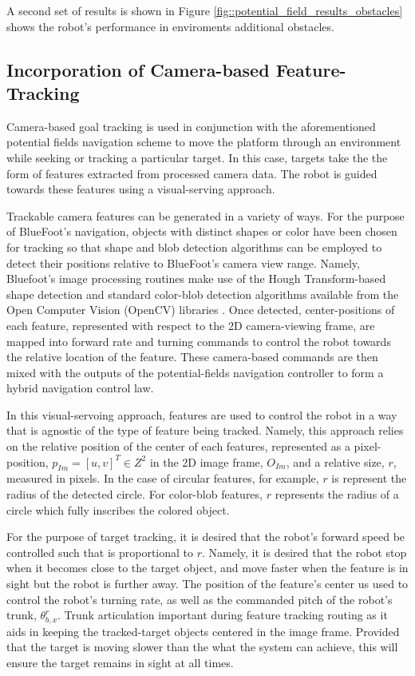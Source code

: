 			A second set of results is shown in Figure \ref{fig::potential_field_results_obstacles} shows the robot's performance in enviroments additional obstacles.

		\subsection{Incorporation of Camera-based Feature-Tracking}
		
			Camera-based goal tracking is used in conjunction with the aforementioned potential fields navigation scheme to move the platform through an environment while seeking or tracking a particular target. In this case, targets take the the form of features extracted from processed camera data. The robot is guided towards these features using a visual-serving approach. 

			Trackable camera features can be generated in a variety of ways. For the purpose of BlueFoot's navigation, objects with distinct shapes or color have been chosen for tracking so that shape and blob detection algorithms can be employed to detect their positions relative to BlueFoot's camera view range. Namely, Bluefoot's image processing routines make use of the Hough Transform-based shape detection and standard color-blob detection algorithms available from the Open Computer Vision (OpenCV) libraries \cite{opencv_library}. Once detected, center-positions of each feature, represented with respect to the 2D camera-viewing frame, are mapped into forward rate and turning commands to control the robot towards the relative location of the feature. These camera-based commands are then mixed with the outputs of the potential-fields navigation controller to form a hybrid navigation control law.

			In this visual-servoing approach, features are used to control the robot in a way that is agnostic of the type of feature being tracked. Namely, this approach relies on the relative position of the center of each features, represented as a pixel-position, $p_{Im} = [u,v]^{T} \in Z^{2}$ in the 2D image frame, $O_{Im}$, and a relative size, $r$, measured in pixels. In the case of circular features, for example, $r$ is represent the radius of the detected circle. For color-blob features, $r$ represents the radius of a circle which fully inscribes the colored object.

			For the purpose of target tracking, it is desired that the robot's forward speed be controlled such that is proportional to $r$. Namely, it is desired that the robot stop when it becomes close to the target object, and move faster when the feature is in sight but the robot is further away. The position of the feature's center us used to control the robot's turning rate, as well as the commanded pitch of the robot's trunk, $\theta_{b,x}^{r}$. Trunk articulation important during feature tracking routing as it aids in keeping the tracked-target objects centered in the image frame. Provided that the target is moving slower than the what the system can achieve, this will ensure the target remains in sight at all times.


